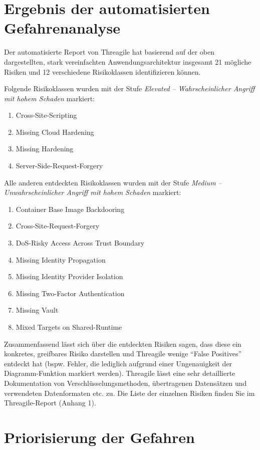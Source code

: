\documentclass{article}
\begin{document}
\section{Ergebnis der automatisierten Gefahrenanalyse}

Der automatisierte Report von Threagile hat basierend auf der oben dargestellten, stark 
vereinfachten Anwendungsarchitektur insgesamt 21 mögliche Risiken und 12 
verschiedene Risikoklassen identifizieren können.

Folgende Risikoklassen wurden mit der Stufe \textit{Elevated – Wahrscheinlicher
Angriff mit hohem Schaden} markiert:

\begin{enumerate}
	\item Cross-Site-Scripting 
	\item Missing Cloud Hardening
	\item Missing Hardening
	\item Server-Side-Request-Forgery
\end{enumerate}

Alle anderen entdeckten Risikoklassen wurden mit der Stufe \textit{Medium – Unwahrscheinlicher
Angriff mit hohem Schaden} markiert:

\begin{enumerate}
	\item Container Base Image Backdooring
	\item Cross-Site-Request-Forgery
	\item DoS-Risky Access Across Trust Boundary
	\item Missing Identity Propagation
	\item Missing Identity Provider Isolation
	\item Missing Two-Factor Authentication
	\item Missing Vault
	\item Mixed Targets on Shared-Runtime
\end{enumerate}

Zusammenfassend lässt sich über die entdeckten Risiken sagen, dass diese ein konkretes,
greifbares Risiko darstellen und Threagile wenige ``False Positives'' entdeckt hat (bspw. 
Fehler, die lediglich aufgrund einer Ungenauigkeit der Diagramm-Funktion markiert werden). 
Threagile lässt eine sehr detaillierte Dokumentation von Verschlüsselungsmethoden, 
übertragenen Datensätzen und verwendeten Datenformaten etc. zu. Die Liste der einzelnen 
Risiken finden Sie im Threagile-Report (Anhang 1). 

\section{Priorisierung der Gefahren}
\end{document}
